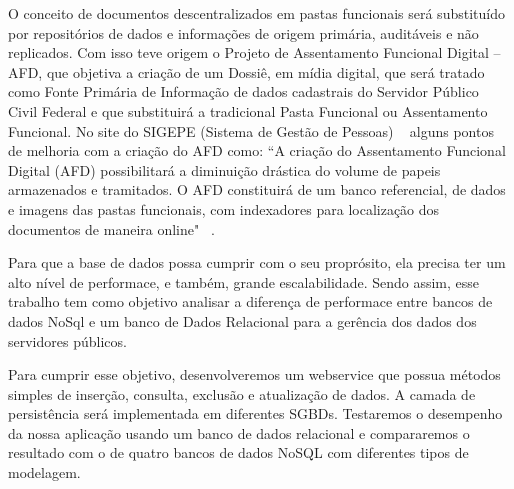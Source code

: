 O conceito de documentos descentralizados em pastas funcionais será substituído por repositórios de dados e informações de origem primária, auditáveis e não replicados. Com isso teve origem o Projeto de Assentamento Funcional Digital – AFD, que objetiva a criação de um Dossiê, em mídia digital, que será tratado como Fonte Primária de Informação de dados cadastrais do Servidor Público Civil Federal e que substituirá a tradicional Pasta Funcional ou Assentamento Funcional. No site do SIGEPE (Sistema de Gestão de Pessoas) ~\cite{siteSIGEPE} alguns pontos de melhoria com a criação do AFD como: “A criação do Assentamento Funcional Digital (AFD) possibilitará a diminuição drástica do volume de papeis armazenados e tramitados. O AFD constituirá de um banco referencial, de dados e imagens das pastas funcionais, com indexadores para localização dos documentos de maneira online" ~\cite{apresentAFD}.

Para que a base de dados possa cumprir com o seu proprósito, ela precisa ter um alto nível de performace, e também, grande escalabilidade. Sendo assim, esse trabalho tem como objetivo analisar a diferença de performace entre bancos de dados NoSql e um banco de Dados Relacional para a gerência dos dados dos servidores públicos.

Para cumprir esse objetivo, desenvolveremos um webservice que possua métodos simples de inserção, consulta, exclusão e atualização de dados. A camada de persistência será implementada em diferentes SGBDs. Testaremos o desempenho da nossa aplicação usando um banco de dados relacional e compararemos o resultado com o de quatro bancos de dados NoSQL com diferentes tipos de modelagem.
